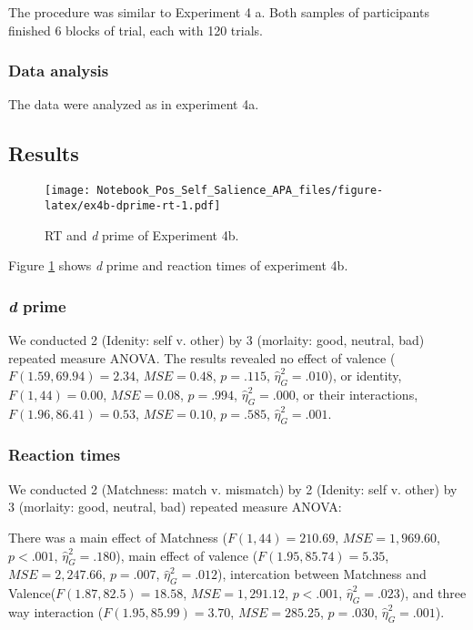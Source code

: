 \documentclass[man]{apa6}
\begin{document}
The procedure was similar to Experiment 4 a. Both samples of participants finished 6 blocks of trial, each with 120 trials.

\hypertarget{data-analysis-7}{%
\subsubsection{Data analysis}\label{data-analysis-7}}

The data were analyzed as in experiment 4a.

\hypertarget{results-7}{%
\subsection{Results}\label{results-7}}

\begin{figure}
\centering
\texttt{[image: Notebook\_Pos\_Self\_Salience\_APA\_files/figure-latex/ex4b-dprime-rt-1.pdf]}
\caption{\label{fig:ex4b-dprime-rt}RT and \emph{d} prime of Experiment 4b.}
\end{figure}

Figure \ref{fig:ex4b-dprime-rt} shows \emph{d} prime and reaction times of experiment 4b.

\hypertarget{d-prime-4}{%
\subsubsection{\texorpdfstring{\emph{d} prime}{d prime}}\label{d-prime-4}}

We conducted 2 (Idenity: self v. other) by 3 (morlaity: good, neutral, bad) repeated measure ANOVA. The results revealed no effect of valence (\(F(1.59, 69.94) = 2.34\), \(\mathit{MSE} = 0.48\), \(p = .115\), \(\hat{\eta}^2_G = .010\)), or identity, \(F(1, 44) = 0.00\), \(\mathit{MSE} = 0.08\), \(p = .994\), \(\hat{\eta}^2_G = .000\), or their interactions, \(F(1.96, 86.41) = 0.53\), \(\mathit{MSE} = 0.10\), \(p = .585\), \(\hat{\eta}^2_G = .001\).

\hypertarget{reaction-times-1}{%
\subsubsection{Reaction times}\label{reaction-times-1}}

We conducted 2 (Matchness: match v. mismatch) by 2 (Idenity: self v. other) by 3 (morlaity: good, neutral, bad) repeated measure ANOVA:

There was a main effect of Matchness (\(F(1, 44) = 210.69\), \(\mathit{MSE} = 1,969.60\), \(p < .001\), \(\hat{\eta}^2_G = .180\)), main effect of valence (\(F(1.95, 85.74) = 5.35\), \(\mathit{MSE} = 2,247.66\), \(p = .007\), \(\hat{\eta}^2_G = .012\)), intercation between Matchness and Valence(\(F(1.87, 82.5) = 18.58\), \(\mathit{MSE} = 1,291.12\), \(p < .001\), \(\hat{\eta}^2_G = .023\)), and three way interaction (\(F(1.95, 85.99) = 3.70\), \(\mathit{MSE} = 285.25\), \(p = .030\), \(\hat{\eta}^2_G = .001\)).
\end{document}
